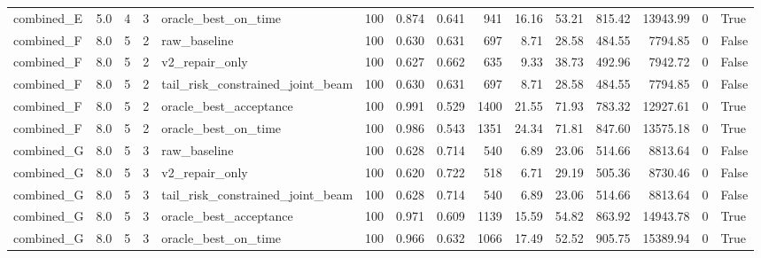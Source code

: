 \begin{table}[htbp]
\begin{tabular}{llrrlrrrrrrrrrl}
combined\_E & 5.0 & 4 & 3 & oracle\_best\_on\_time & 100 & 0.874 & 0.641 & 941 & 16.16 & 53.21 & 815.42 & 13943.99 & 0 & True \\
combined\_F & 8.0 & 5 & 2 & raw\_baseline & 100 & 0.630 & 0.631 & 697 & 8.71 & 28.58 & 484.55 & 7794.85 & 0 & False \\
combined\_F & 8.0 & 5 & 2 & v2\_repair\_only & 100 & 0.627 & 0.662 & 635 & 9.33 & 38.73 & 492.96 & 7942.72 & 0 & False \\
combined\_F & 8.0 & 5 & 2 & tail\_risk\_constrained\_joint\_beam & 100 & 0.630 & 0.631 & 697 & 8.71 & 28.58 & 484.55 & 7794.85 & 0 & False \\
combined\_F & 8.0 & 5 & 2 & oracle\_best\_acceptance & 100 & 0.991 & 0.529 & 1400 & 21.55 & 71.93 & 783.32 & 12927.61 & 0 & True \\
combined\_F & 8.0 & 5 & 2 & oracle\_best\_on\_time & 100 & 0.986 & 0.543 & 1351 & 24.34 & 71.81 & 847.60 & 13575.18 & 0 & True \\
combined\_G & 8.0 & 5 & 3 & raw\_baseline & 100 & 0.628 & 0.714 & 540 & 6.89 & 23.06 & 514.66 & 8813.64 & 0 & False \\
combined\_G & 8.0 & 5 & 3 & v2\_repair\_only & 100 & 0.620 & 0.722 & 518 & 6.71 & 29.19 & 505.36 & 8730.46 & 0 & False \\
combined\_G & 8.0 & 5 & 3 & tail\_risk\_constrained\_joint\_beam & 100 & 0.628 & 0.714 & 540 & 6.89 & 23.06 & 514.66 & 8813.64 & 0 & False \\
combined\_G & 8.0 & 5 & 3 & oracle\_best\_acceptance & 100 & 0.971 & 0.609 & 1139 & 15.59 & 54.82 & 863.92 & 14943.78 & 0 & True \\
combined\_G & 8.0 & 5 & 3 & oracle\_best\_on\_time & 100 & 0.966 & 0.632 & 1066 & 17.49 & 52.52 & 905.75 & 15389.94 & 0 & True \\
\bottomrule
\end{tabular}
\end{table}
